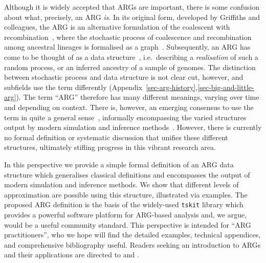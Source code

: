 \documentclass{article}
\begin{document}
Although it is widely accepted that ARGs are important, there is some
confusion about what, precisely, an ARG \emph{is}.
In its original form,
developed by Griffiths and colleagues,
the ARG is an alternative
formulation of the coalescent with recombination~\citep{hudson1983properties},
where the stochastic process of coalescence and recombination
among ancestral lineages is formalised
as a graph~\citep{griffiths1991two,
ethier1990two,griffiths1996ancestral,griffiths1997ancestral}.
Subsequently, an ARG has come to be thought of as a data
structure~\citep{minichiello2006mapping}, i.e.\ describing
a \emph{realisation} of such a random process,
or an inferred ancestry of a sample of genomes.
The distinction between stochastic process
and data structure is not clear cut, however, and subfields use the term
differently (Appendix~\ref{sec-arg-history},\ref{sec-big-and-little-arg}).
The term ``ARG'' therefore has many different meanings, varying 
over time and depending on context. 
There is, however, an emerging consensus to use the term
in quite a general sense~\citep[e.g.][]{mathieson2020ancestry,hejase2020summary,
schaefer2021ancestral,harris2023using,zhang2023biobank,fan2023likelihood},
informally
encompassing the varied structures output by modern simulation and
inference methods~\citep{rasmussen2014genome, palamara2016argon, haller2018tree,
kelleher2019inferring, speidel2019method, baumdicker2021efficient,
zhang2023biobank}. 
However, there is currently no formal definition or systematic 
discussion that unifies these different structures, 
ultimately stifling progress in this vibrant research area.

In this perspective we provide a simple formal definition
of an ARG data structure which generalises classical 
definitions and encompasses the output of modern simulation and inference 
methods. We show that different levels of approximation
are possible using this structure, illustrated via examples.
The proposed ARG definition is the basis of the widely-used \texttt{tskit}
library which provides a powerful software platform
for ARG-based analysis and, we argue, would be a useful community standard.
This perspective is intended for ``ARG practitioners'', who we hope
will find the detailed examples, technical appendices, and 
comprehensive bibliography useful.
Readers seeking an introduction to ARGs and their applications are 
directed to \citet{lewanski2024era}
and \citet{brandt2024promise}.
\end{document}
